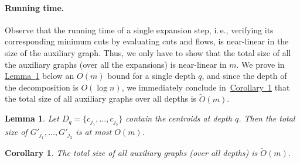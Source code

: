 \documentclass[11pt]{article}
\numberwithin{equation}{section}
\newtheorem{lemma}[theorem]{Lemma}
\newtheorem{corollary}[theorem]{Corollary}
\theoremstyle{definition}
\theoremstyle{plain}
\newcommand{\ie}{i.\,e.}
\newcommand{\expref}[2]{\hyperref[#2]{#1~\ref{#2}}}
\theoremstyle{plain}
\newcommand\tO{\ensuremath{\widetilde O}}  %
\begin{document}
\paragraph{Running time.}
Observe that the running time of a single expansion step,
\ie, verifying its corresponding minimum cuts by evaluating cuts and flows,
is near-linear in the size of the auxiliary graph.
Thus, we only have to show that the total size of all the auxiliary graphs
(over all the expansions) is near-linear in $m$.
We prove in \expref{Lemma}{lemma:size} below an $O(m)$ bound for a single depth $q$,
and since the depth of the decomposition is $O(\log n)$,
we immediately conclude in~\expref{Corollary}{cor:total}
that the total size of all auxiliary graphs over all depths is $\tO(m)$.

\begin{lemma}\label{lemma:size}
Let $D_q=\{c_{j_1},\dots,c_{j_2}\}$ contain the centroids at depth $q$.
Then the total size of $G'_{j_1},\dots,G'_{j_2}$ is at most $O(m)$.
\end{lemma}

\begin{corollary}\label{cor:total}
The total size of all auxiliary graphs
(over all depths) is $\tO(m)$.
\end{corollary}
\end{document}
